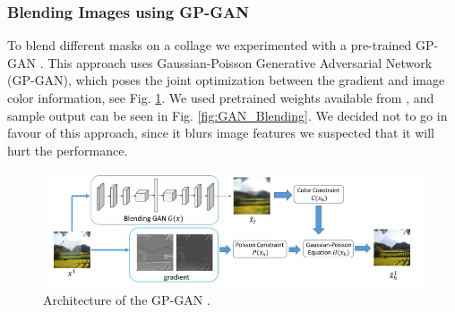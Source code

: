 \documentclass{article}
\begin{document}

\subsubsection{Blending Images using GP-GAN}
To blend different masks on a collage we experimented with a pre-trained GP-GAN \cite{wu2019gp}. This approach uses Gaussian-Poisson Generative Adversarial Network (GP-GAN), which poses the joint optimization between the gradient and image color information, see Fig. \ref{fig:GP-GAN_Arch}. We used pretrained weights available from \cite{wu2019gp}, and sample output can be seen in Fig. \ref{fig:GAN_Blending}. We decided not to go in favour of this approach, since it blurs image features we suspected that it will hurt the performance.

\begin{figure}
    \centering
    \includegraphics[width=\linewidth]{data/images/04_GP_GAN/GP_GAN.png}
    \caption{Architecture of the GP-GAN \cite{wu2019gp}. }
    \label{fig:GP-GAN_Arch}
\end{figure}
\end{document}
